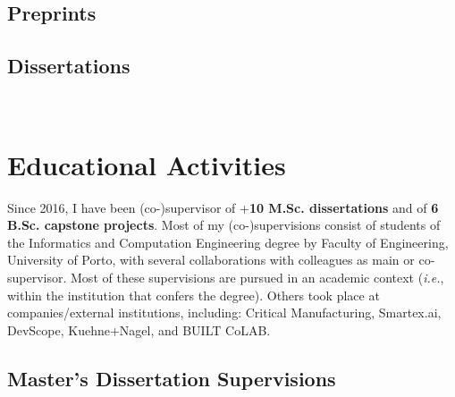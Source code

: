 \documentclass[10pt, a4paper]{article}
\newcommand{\FEUP}{Faculty of Engineering, University of Porto}
\newcommand{\years}[1]{\marginnote{\raggedleft\footnotesize #1}}
\begin{document}
\begin{etaremune}
	\renewcommand\labelenumi{\footnotesize\theenumi .}
	\item {}
	\item {}
	\item {}
	\item {}
\end{etaremune}

\subsection*{Preprints}

\begin{etaremune}
	\renewcommand\labelenumi{\footnotesize\theenumi .}
	\item  {}
\end{etaremune}


\subsection*{Dissertations}


\years{2022} 
\\[0.42em]
\years{2016} 




\section*{Educational Activities}

Since 2016, I have been (co-)supervisor of +\textbf{10 M.Sc. dissertations} and of \textbf{6 B.Sc. capstone projects}. Most of my (co-)supervisions consist of students of the Informatics and Computation Engineering degree by \FEUP, with several collaborations with colleagues as main or co-supervisor. Most of these supervisions are pursued in an academic context (\textit{i.e.}, within the institution that confers the degree). Others took place at companies/external institutions, including: Critical Manufacturing, Smartex.ai, DevScope, Kuehne+Nagel, and BUILT CoLAB.

\subsection*{Master's Dissertation Supervisions}
\end{document}
